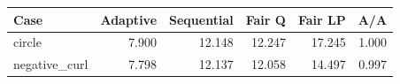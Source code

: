 \begin{tabular}{lrrrrr}
\toprule
Case & Adaptive & Sequential & Fair Q & Fair LP & A/A \\
\midrule
circle & 7.900 & 12.148 & 12.247 & 17.245 & 1.000 \\
negative\_curl & 7.798 & 12.137 & 12.058 & 14.497 & 0.997 \\
\bottomrule
\end{tabular}
